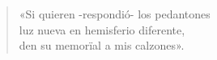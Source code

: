 \begin{verse}


«Si quieren -respondió- los pedantones\\
luz nueva en hemisferio diferente,\\
den su memorïal a mis calzones».

\end{verse}
